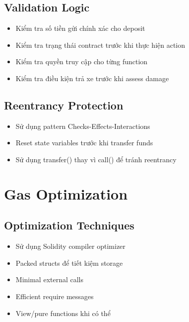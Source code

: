\documentclass[12pt,a4paper]{article}
\begin{document}
\subsection{Validation Logic}
\begin{itemize}
\item Kiểm tra số tiền gửi chính xác cho deposit
\item Kiểm tra trạng thái contract trước khi thực hiện action
\item Kiểm tra quyền truy cập cho từng function
\item Kiểm tra điều kiện trả xe trước khi assess damage
\end{itemize}

\subsection{Reentrancy Protection}
\begin{itemize}
\item Sử dụng pattern Checks-Effects-Interactions
\item Reset state variables trước khi transfer funds
\item Sử dụng transfer() thay vì call() để tránh reentrancy
\end{itemize}

\section{Gas Optimization}

\subsection{Optimization Techniques}
\begin{itemize}
\item Sử dụng Solidity compiler optimizer
\item Packed structs để tiết kiệm storage
\item Minimal external calls
\item Efficient require messages
\item View/pure functions khi có thể
\end{itemize}
\end{document}
